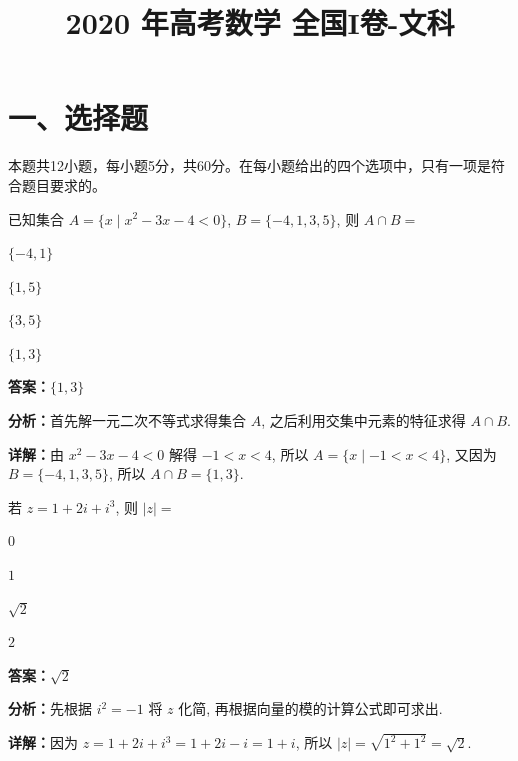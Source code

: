 ﻿\title{2020 年高考数学 全国I卷-文科}
\date{}
\maketitle

\section*{一、选择题}
本题共12小题，每小题5分，共60分。在每小题给出的四个选项中，只有一项是符合题目要求的。

\begin{question}[points=5]
已知集合 $A = \{x \mid x^2 - 3x - 4 < 0\}$, $B = \{-4, 1, 3, 5\}$, 则 $A \cap B =$
\begin{choices}
  \item $\{-4, 1\}$
  \item $\{1, 5\}$
  \item $\{3, 5\}$
  \item $\{1, 3\}$
\end{choices}
\begin{solution}
\textbf{答案：}$\{1, 3\}$

\textbf{分析：}首先解一元二次不等式求得集合 $A$, 之后利用交集中元素的特征求得 $A \cap B$.

\textbf{详解：}由 $x^2 - 3x - 4 < 0$ 解得 $-1 < x < 4$, 所以 $A = \{x \mid -1 < x < 4\}$, 又因为 $B = \{-4, 1, 3, 5\}$, 所以 $A \cap B = \{1, 3\}$.
\end{solution}
\end{question}

\begin{question}[points=5]
若 $z = 1 + 2i + i^3$, 则 $|z| =$
\begin{choices}
  \item $0$
  \item $1$
  \item $\sqrt{2}$
  \item $2$
\end{choices}
\begin{solution}
\textbf{答案：}$\sqrt{2}$

\textbf{分析：}先根据 $i^2 = -1$ 将 $z$ 化简, 再根据向量的模的计算公式即可求出.

\textbf{详解：}因为 $z = 1 + 2i + i^3 = 1 + 2i - i = 1 + i$, 所以 $|z| = \sqrt{1^2 + 1^2} = \sqrt{2}$.
\end{solution}
\end{question}

